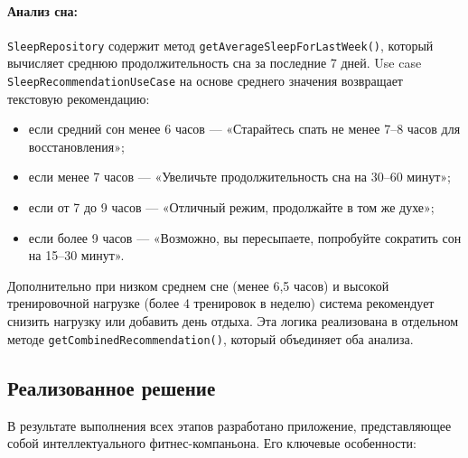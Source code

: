 \paragraph{Анализ сна:}
\texttt{SleepRepository} содержит метод \texttt{getAverageSleepForLastWeek()}, который вычисляет среднюю продолжительность сна за последние 7 дней. Use case \texttt{SleepRecommendationUseCase} на основе среднего значения возвращает текстовую рекомендацию:
\begin{itemize}
    \item если средний сон менее 6 часов — «Старайтесь спать не менее 7–8 часов для восстановления»;
    \item если менее 7 часов — «Увеличьте продолжительность сна на 30–60 минут»;
    \item если от 7 до 9 часов — «Отличный режим, продолжайте в том же духе»;
    \item если более 9 часов — «Возможно, вы пересыпаете, попробуйте сократить сон на 15–30 минут».
\end{itemize}
Дополнительно при низком среднем сне (менее 6,5 часов) и высокой тренировочной нагрузке (более 4 тренировок в неделю) система рекомендует снизить нагрузку или добавить день отдыха. Эта логика реализована в отдельном методе \texttt{getCombinedRecommendation()}, который объединяет оба анализа.

\subsection{Реализованное решение}

В результате выполнения всех этапов разработано приложение, представляющее собой интеллектуального фитнес-компаньона. Его ключевые особенности:

